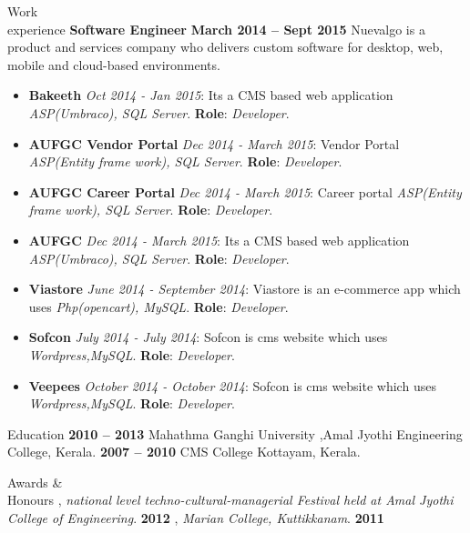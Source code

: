 \documentclass{resume}
\begin{document}
\begin{category}{Work \\experience}
  \citemnobullet \textbf{Software Engineer} \hfill \textbf{March 2014 -- Sept 2015}
  \citemnobullet Nuevalgo is a product and services company who delivers custom software for desktop, web, mobile and cloud-based environments.
  \begin{itemize}
  \item \textbf{Bakeeth} {\em Oct 2014 - Jan 2015}: Its a CMS based web application {\em ASP(Umbraco),  SQL Server}. \textbf{Role}: {\em Developer}.  
  \item \textbf{AUFGC Vendor Portal} {\em Dec 2014 - March 2015}: Vendor Portal {\em ASP(Entity frame work),  SQL Server}. \textbf{Role}: {\em Developer}.  
  \item \textbf{AUFGC Career Portal} {\em Dec 2014 - March 2015}: Career portal {\em ASP(Entity frame work),  SQL Server}. \textbf{Role}: {\em Developer}.  
  \item \textbf{AUFGC} {\em Dec 2014 - March 2015}: Its a CMS based web application {\em ASP(Umbraco),  SQL Server}. \textbf{Role}: {\em Developer}.  
  \item \textbf{Viastore} {\em June 2014 - September 2014}: Viastore is an e-commerce app which uses {\em Php(opencart),  MySQL}. \textbf{Role}: {\em Developer}.  
  \item \textbf{Sofcon} {\em July 2014 - July 2014}: Sofcon is cms website which uses {\em Wordpress,MySQL}. \textbf{Role}: {\em Developer}.
  \item \textbf{Veepees} {\em October 2014 - October 2014}: Sofcon is cms website which uses {\em Wordpress,MySQL}. \textbf{Role}: {\em Developer}.
  \end{itemize}
  \end{category}


\begin{category}{Education}
   \hfill \textbf{2010 -- 2013}
  \citemnobullet Mahathma Ganghi University ,Amal Jyothi Engineering College, Kerala.
   \hfill \textbf{2007 -- 2010}
  \citemnobullet CMS College Kottayam, Kerala.
\end{category}



\begin{category}{Awards \&\\ Honours}
  , {\em national level techno-cultural-managerial Festival held at Amal Jyothi College of Engineering}. \hfill \textbf{2012}
  , {\em Marian College, Kuttikkanam}. \hfill \textbf{2011}
  
\end{category}
\end{document}
